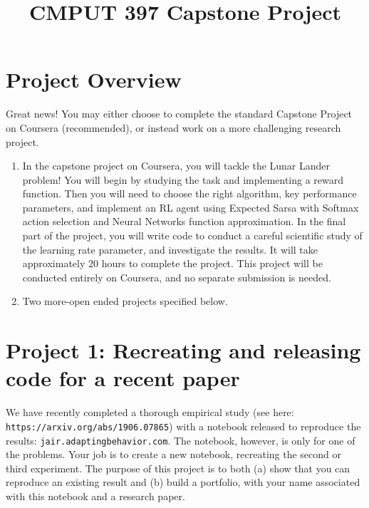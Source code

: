 \documentclass[10pt]{article}
\title {CMPUT 397 Capstone Project}
\begin{document}
\maketitle

\section*{Project Overview}
Great news! You may either choose to complete the standard Capstone Project on Coursera (recommended), or instead work on a more challenging research project. 

\begin{enumerate}
\item In the capstone project on Coursera, you will tackle the Lunar Lander problem! You will begin by studying the task and implementing a reward function. Then you will need to choose the right algorithm, key performance parameters, and implement an RL agent using Expected Sarsa with Softmax action selection and Neural Networks function approximation. In the final part of the project, you will write code to conduct a careful scientific study of the learning rate parameter, and investigate the results. It will take approximately 20 hours to complete the project. This project will be conducted entirely on Coursera, and no separate submission is needed.
\item Two more-open ended projects specified below.
\end{enumerate}

\section{Project 1: Recreating and releasing code for a recent paper}

We have recently completed a thorough empirical study (see here: \verb+https://arxiv.org/abs/1906.07865+) with a notebook released to reproduce the results: \verb+jair.adaptingbehavior.com+. The notebook, however, is only for one of the problems. Your job is to create a new notebook, recreating the second or third experiment. The purpose of this project is to both (a) show that you can reproduce an existing result and (b) build a portfolio, with your name associated with this notebook and a research paper. 
\end{document}
